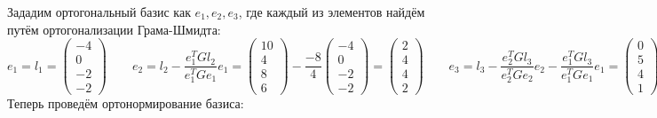 \documentclass{article}
\begin{document}
\begin{center}
    Зададим ортогональный базис как $e_1, e_2, e_3$, где каждый из элементов найдём путём ортогонализации Грама-Шмидта:
    $$
        e_1 = l_1 = \begin{pmatrix}
            -4 \\ 0 \\ -2 \\ -2
        \end{pmatrix} \qquad
        e_2 = l_2 - \frac{e_1^{T}Gl_2}{e_1^{T}Ge_1} e_1 = \begin{pmatrix}
            10 \\ 4 \\ 8 \\ 6
        \end{pmatrix} - \frac{-8}{4} \begin{pmatrix}
            -4 \\ 0 \\ -2 \\ -2
        \end{pmatrix} = \begin{pmatrix}
            2 \\ 4 \\ 4 \\ 2
        \end{pmatrix} \qquad
        e_3 = l_3 - \frac{e_2^{T}Gl_3}{e_2^{T}Ge_2} e_2 - \frac{e_1^{T}Gl_3}{e_1^{T}Ge_1} e_1 = \begin{pmatrix}
            0 \\ 5 \\ 4 \\ 1
        \end{pmatrix} - \frac{4}{4} \begin{pmatrix}
            2 \\ 4 \\ 4 \\ 2
        \end{pmatrix} - \frac{0}{4} \begin{pmatrix}
            -4 \\ 0 \\ -2 \\ -2
        \end{pmatrix} = \begin{pmatrix}
            -2 \\ 1 \\ 0 \\ -1
        \end{pmatrix}
    $$
    Теперь проведём ортонормирование базиса:

\end{center}
\end{document}
